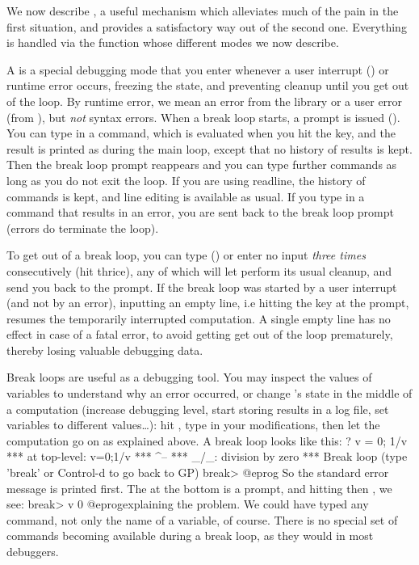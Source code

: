 We now describe , a useful mechanism which alleviates
much of the pain in the first situation, and provides a satisfactory way out
of the second one. Everything is handled via the  function whose
different modes we now describe.

\label{se:breakloop}

A  is a special debugging mode that you enter whenever a
user interrupt () or runtime error occurs, freezing the
 state, and preventing cleanup until you get out of the loop. By
runtime error, we mean an error from the library or a user error (from
), but \emph{not} syntax errors. When a break loop starts, a
prompt is issued (). You can type in a  command, which is
evaluated when you hit the  key, and the result is printed as
during the main  loop, except that no history of results is kept.
Then the break loop prompt reappears and you can type further commands as
long as you do not exit the loop. If you are using readline, the history of
commands is kept, and line editing is available as usual. If you type in a
command that results in an error, you are sent back to the break loop prompt
(errors do  terminate the loop).

To get out of a break loop, you can type
 () or enter no input \emph{three times} consecutively
(hit  thrice), any of which will let 
perform its usual cleanup, and send you back to the  prompt. If the
break loop was started by a user interrupt (and not by an error),
inputting an empty line, i.e hitting the  key at the
 prompt, resumes the temporarily interrupted computation.
A single empty line has no effect in case of a fatal error, to avoid
getting get out of the loop prematurely, thereby losing valuable debugging
data.

Break loops are useful as a debugging tool. You may inspect the values of
 variables to understand why an error occurred, or change
's state in the middle of a computation (increase debugging level,
start storing results in a log file, set variables to different values\dots):
hit , type in your modifications, then let the computation go on as
explained above. A break loop looks like this:
\bprog
? v = 0; 1/v
  ***   at top-level: v=0;1/v
  ***                      ^--
  *** _/_: division by zero
  ***   Break loop (type 'break' or Control-d to go back to GP)
break>
@eprog
\noindent So the standard error message is printed first. The
 at the bottom is a prompt, and hitting  then
, we see:
\bprog
break> v
0
@eprog\noindent explaining the problem. We could have typed any 
command, not only the name of a variable, of course. There is no special set
of commands becoming available during a break loop, as they would in most
debuggers.

